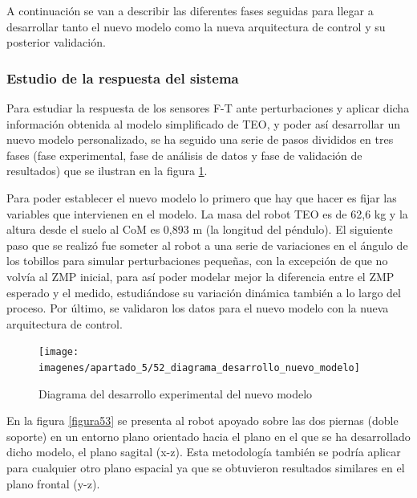 A continuación se van a describir las diferentes fases seguidas para llegar a desarrollar tanto el nuevo modelo como la nueva arquitectura de control y su posterior validación.

\subsubsection{Estudio de la respuesta del sistema}

Para estudiar la respuesta de los sensores F-T ante perturbaciones y aplicar dicha información obtenida al modelo simplificado de TEO, y poder así desarrollar un nuevo modelo personalizado, se ha seguido una serie de pasos divididos en tres fases (fase experimental, fase de análisis de datos y fase de validación de resultados) que se ilustran en la figura \ref{figura52}. 

Para poder establecer el nuevo modelo lo primero que hay que hacer es fijar las variables que intervienen en el modelo. La masa del robot TEO es de 62,6 kg y la altura desde el suelo al CoM es 0,893 m (la longitud del péndulo). El siguiente paso que se realizó fue someter al robot a una serie de variaciones en el ángulo de los tobillos para simular perturbaciones pequeñas, con la excepción de que no volvía al ZMP inicial, para así poder modelar mejor la diferencia entre el ZMP esperado y el medido, estudiándose su variación dinámica también a lo largo del proceso. Por último, se validaron los datos para el nuevo modelo con la nueva arquitectura de control.

\begin{figure}[H]
\centering
\texttt{[image: imagenes/apartado\_5/52\_diagrama\_desarrollo\_nuevo\_modelo]}
\caption{Diagrama del desarrollo experimental del nuevo modelo}
\label{figura52}
\end{figure}

En la figura \ref{figura53} se presenta al robot apoyado sobre las dos piernas (doble soporte) en un entorno plano orientado hacia el plano en el que se ha desarrollado dicho modelo, el plano sagital (x-z). Esta metodología también se podría aplicar para cualquier otro plano espacial ya que se obtuvieron resultados similares en el plano frontal (y-z). 

